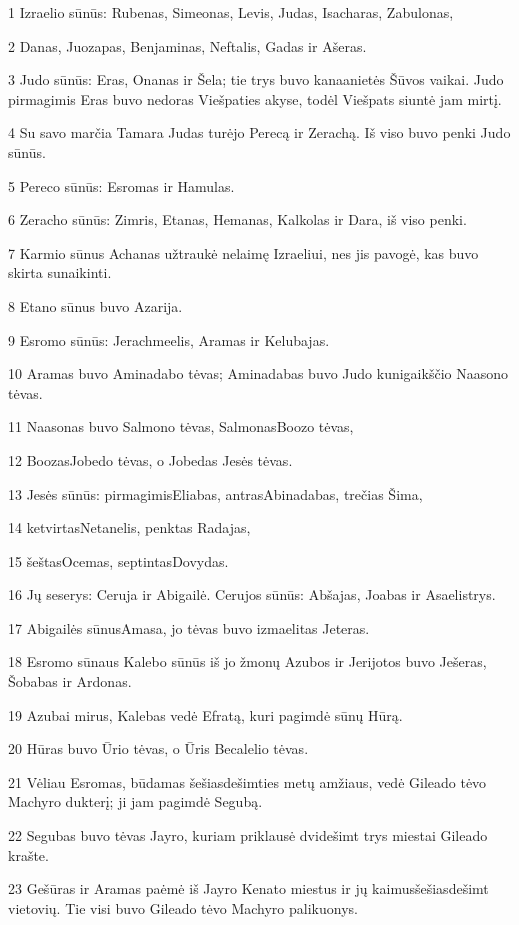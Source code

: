 \par 1 Izraelio sūnūs: Rubenas, Simeonas, Levis, Judas, Isacharas, Zabulonas, 
\par 2 Danas, Juozapas, Benjaminas, Neftalis, Gadas ir Ašeras. 
\par 3 Judo sūnūs: Eras, Onanas ir Šela; tie trys buvo kanaanietės Šūvos vaikai. Judo pirmagimis Eras buvo nedoras Viešpaties akyse, todėl Viešpats siuntė jam mirtį. 
\par 4 Su savo marčia Tamara Judas turėjo Perecą ir Zerachą. Iš viso buvo penki Judo sūnūs. 
\par 5 Pereco sūnūs: Esromas ir Hamulas. 
\par 6 Zeracho sūnūs: Zimris, Etanas, Hemanas, Kalkolas ir Dara, iš viso penki. 
\par 7 Karmio sūnus Achanas užtraukė nelaimę Izraeliui, nes jis pavogė, kas buvo skirta sunaikinti. 
\par 8 Etano sūnus buvo Azarija. 
\par 9 Esromo sūnūs: Jerachmeelis, Aramas ir Kelubajas. 
\par 10 Aramas buvo Aminadabo tėvas; Aminadabas buvo Judo kunigaikščio Naasono tėvas. 
\par 11 Naasonas buvo Salmono tėvas, Salmonas­Boozo tėvas, 
\par 12 Boozas­Jobedo tėvas, o Jobedas­ Jesės tėvas. 
\par 13 Jesės sūnūs: pirmagimis­Eliabas, antras­Abinadabas, trečias­ Šima, 
\par 14 ketvirtas­Netanelis, penktas­ Radajas, 
\par 15 šeštas­Ocemas, septintas­Dovydas. 
\par 16 Jų seserys: Ceruja ir Abigailė. Cerujos sūnūs: Abšajas, Joabas ir Asaelis­trys. 
\par 17 Abigailės sūnus­Amasa, jo tėvas buvo izmaelitas Jeteras. 
\par 18 Esromo sūnaus Kalebo sūnūs iš jo žmonų Azubos ir Jerijotos buvo Ješeras, Šobabas ir Ardonas. 
\par 19 Azubai mirus, Kalebas vedė Efratą, kuri pagimdė sūnų Hūrą. 
\par 20 Hūras buvo Ūrio tėvas, o Ūris­ Becalelio tėvas. 
\par 21 Vėliau Esromas, būdamas šešiasdešimties metų amžiaus, vedė Gileado tėvo Machyro dukterį; ji jam pagimdė Segubą. 
\par 22 Segubas buvo tėvas Jayro, kuriam priklausė dvidešimt trys miestai Gileado krašte. 
\par 23 Gešūras ir Aramas paėmė iš Jayro Kenato miestus ir jų kaimus­šešiasdešimt vietovių. Tie visi buvo Gileado tėvo Machyro palikuonys. 
